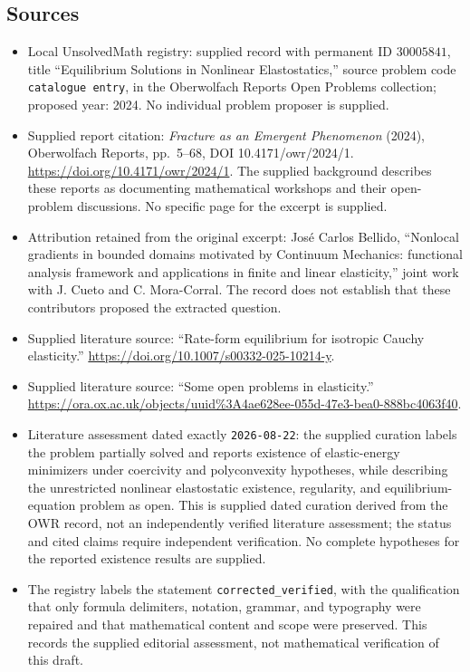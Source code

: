 \documentclass[11pt]{article}
\begin{document}
\subsection{Sources}
\begin{itemize}
\item Local UnsolvedMath registry: supplied record with permanent ID \(30005841\), title ``Equilibrium Solutions in Nonlinear Elastostatics,'' source problem code \texttt{catalogue entry}, in the Oberwolfach Reports Open Problems collection; proposed year: 2024. No individual problem proposer is supplied.
\item Supplied report citation: \emph{Fracture as an Emergent Phenomenon} (2024), Oberwolfach Reports, pp.\ 5--68, DOI 10.4171/owr/2024/1. \url{https://doi.org/10.4171/owr/2024/1}. The supplied background describes these reports as documenting mathematical workshops and their open-problem discussions. No specific page for the excerpt is supplied.
\item Attribution retained from the original excerpt: Jos\'e Carlos Bellido, ``Nonlocal gradients in bounded domains motivated by Continuum Mechanics: functional analysis framework and applications in finite and linear elasticity,'' joint work with J. Cueto and C. Mora-Corral. The record does not establish that these contributors proposed the extracted question.
\item Supplied literature source: ``Rate-form equilibrium for isotropic Cauchy elasticity.'' \url{https://doi.org/10.1007/s00332-025-10214-y}.
\item Supplied literature source: ``Some open problems in elasticity.'' \url{https://ora.ox.ac.uk/objects/uuid%3A4ae628ee-055d-47e3-bea0-888bc4063f40}.
\item Literature assessment dated exactly \texttt{2026-08-22}: the supplied curation labels the problem partially solved and reports existence of elastic-energy minimizers under coercivity and polyconvexity hypotheses, while describing the unrestricted nonlinear elastostatic existence, regularity, and equilibrium-equation problem as open. This is supplied dated curation derived from the OWR record, not an independently verified literature assessment; the status and cited claims require independent verification. No complete hypotheses for the reported existence results are supplied.
\item The registry labels the statement \texttt{corrected\_verified}, with the qualification that only formula delimiters, notation, grammar, and typography were repaired and that mathematical content and scope were preserved. This records the supplied editorial assessment, not mathematical verification of this draft.
\end{itemize}
\end{document}
